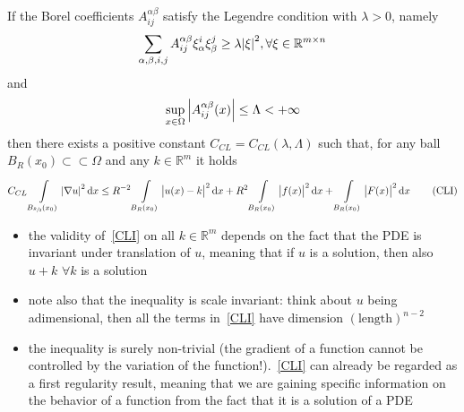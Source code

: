 \begin{thm}
    If the Borel coefficients \(A_{ij}^{\alpha \beta}\) satisfy the Legendre condition with \(\lambda>0\), namely 
    \begin{gather}
        \sum_{\alpha,\beta,i,j} A_{ij}^{\alpha\beta} \xi_{\alpha}^{i} \xi_{\beta}^{j} \geq \lambda \abs{\xi}^{2}, \forall \xi \in \mathbb{R}^{m \times n}
    \end{gather}
    and
    \begin{gather}
        \sup_{x \in \Omega} \abs{A_{ij}^{\alpha\beta}(x)} \leq \Lambda < + \infty 
    \end{gather}
    then there exists a positive constant \(C_{CL} = C_{CL}(\lambda, \Lambda)\) such that, for any ball \(B_{R}(x_{0})\subset \subset \Omega \) and any \(k \in \mathbb{R}^{m}\) it holds 
    \begin{gather}
        C_{CL}\int\limits_{B_{\sfrac{R}{2}}(x_{0})}^{} \abs{\nabla u}^{2} \dd{x} \leq R^{-2}\int\limits_{B_{R}(x_{0})}^{} \abs{u(x)-k}^{2} \dd{x} + R^{2}\int\limits_{B_{R}(x_{0})} \abs{f(x)}^{2} \dd{x} +  \int\limits_{B_{R}(x_{0})} \abs{F(x)}^{2} \dd{x} \tag{CLI}\label{CLI}
    \end{gather}
\end{thm}
\begin{remark}
    \begin{itemize}
        \item the validity of~\eqref{CLI} on all \(k \in \mathbb{R}^{m}\) depends on the fact that the PDE is invariant under translation of \(u\), meaning that if \(u\) is a solution, then also \(u+k\) \(\forall k\) is a solution
        \item note also that the inequality is scale invariant: think about \(u\) being adimensional, then all the terms in~\eqref{CLI} have dimension \({(\text{length})}^{n-2}\)
        \item the inequality is surely non-trivial (the gradient of a function cannot be controlled by the variation of the function!).~\eqref{CLI} can already be regarded as a first regularity result, meaning that we are gaining specific information on the behavior of a function from the fact that it is a solution of a PDE
    \end{itemize}
\end{remark}
